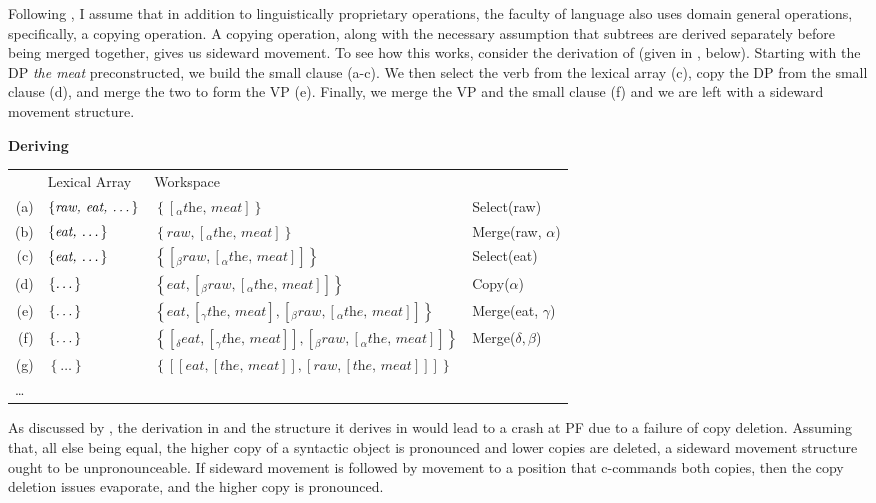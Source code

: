 \documentclass[letterpaper,12pt]{article}
\newcommand{\figex}{\refstepcounter{ExNo}\theExNo\hspace{\Exlabelsep}}
\begin{document}
Following \textcite{hornstein2009theory,nunes2001sideward}, I assume that in addition to linguistically proprietary operations, the faculty of language also uses domain general operations, specifically, a copying operation.
A copying operation, along with the necessary assumption that subtrees are derived separately before being merged together, gives us sideward movement.
To see how this works, consider the derivation of \Last (given in \Next, below).
Starting with the DP \textit{the meat} preconstructed, we build the small clause (a-c).
We then select the verb from the lexical array (c), copy the DP from the small clause (d), and merge the two to form the VP (e).
Finally, we merge the VP and the small clause (f) and we are left with a sideward movement structure.
\begin{table}
  \figex \textbf{Deriving \LLast}\\
  {\small
\begin{tabular}[t]{rlll}
  & Lexical Array & Workspace\\
  (a) & 
  $\left\{ \textit{raw, eat, \dots} \right\}$ &
  $\left\{ \left[_\alpha \textit{the, meat} \right] \right\}$ &
  Select(raw)\\
  (b) &
  $\left\{ \textit{eat, \dots} \right\}$ &
  $\left\{ \textit{raw}, \left[_\alpha\textit{the, meat}\right] \right\}$ &
  Merge(raw, $\alpha$)\\
  (c) &
  $\left\{  \textit{eat, \dots}\right\}$ &
  $\left\{ \left[_\beta \textit{raw}, \left[_\alpha\textit{the, meat}\right] \right] \right\}$ &
  Select(eat)\\
  (d) &
  $\left\{ \textit{\dots} \right\}$ &
  $\left\{ \textit{eat}, \left[_\beta \textit{raw}, \left[_\alpha\textit{the, meat}\right] \right] \right\}$ &
  Copy($\alpha$)\\
  (e) &
  $\left\{ \textit{\dots} \right\}$ &
  $\left\{ \textit{eat}, \left[_\gamma\textit{the, meat}\right], \left[_\beta \textit{raw}, \left[_\alpha\textit{the, meat}\right] \right] \right\}$ &
  Merge(eat,  $\gamma$)\\
  (f) &
  $\left\{ \textit{\dots} \right\}$ &
  $\left\{ \left[_\delta\textit{eat}, \left[_\gamma\textit{the, meat}\right]\right], \left[_\beta \textit{raw}, \left[_\alpha\textit{the, meat}\right] \right] \right\}$ &
  Merge($\delta, \beta$)\\
  (g) &
  $\left\{ \ldots \right\}$ &
  $\left\{  \left[ \left[\textit{eat}, \left[\textit{the, meat}\right]\right], \left[ \textit{raw}, \left[\textit{the, meat}\right] \right] \right]\right\}$ &
  \\
  \multicolumn{3}{l}{\dots}
\end{tabular}}
\end{table}
As discussed by \textcite{nunes2001sideward}, the derivation in \Last and the structure it derives in \LLast would lead to a crash at PF due to a failure of copy deletion.
Assuming that, all else being equal, the higher copy of a syntactic object is pronounced and lower copies are deleted, a sideward movement structure ought to be unpronounceable.
If sideward movement is followed by movement to a position that c-commands both copies, then the copy deletion issues evaporate, and the higher copy is pronounced.
\end{document}
